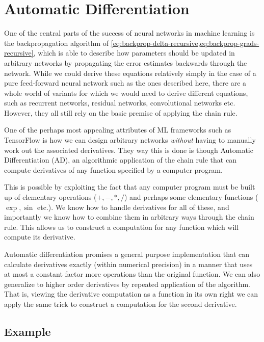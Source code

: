 \documentclass[Thesis.tex]{subfiles}
\begin{document}
\chapter{Automatic Differentiation}
\label{chp:auto-diff}

One of the central parts of the success of neural networks in machine learning
is the backpropagation algorithm of
\cref{eq:backprop-delta-recursive,eq:backprop-grads-recursive}, which is able to
describe how parameters should be updated in arbitrary networks by propagating
the error estimates backwards through the network. While we could derive these
equations relatively simply in the case of a pure feed-forward neural network
such as the ones described here, there are a whole world of variants for which
we would need to derive different equations, such as recurrent networks,
residual networks, convolutional networks etc. However, they all still rely on the basic
premise of applying the chain rule.

One of the perhaps most appealing attributes of ML frameworks such as TensorFlow
is how we can design arbitrary networks \emph{without} having to manually work
out the associated derivatives. They way this is done is though Automatic
Differentiation (AD), an algorithmic application of the chain rule that can
compute derivatives of any function specified by a computer program.

This is possible by exploiting the fact that any computer program must be built
up of elementary operations (\(+,-,*,/\)) and perhaps some elementary functions
(\(\exp, \sin\) etc.). We know how to handle derivatives for all of these, and
importantly we know how to combine them in arbitrary ways through the chain
rule. This allows us to construct a computation for any function which
will compute its derivative.

Automatic differentiation promises a general purpose implementation that can
calculate derivatives exactly (within numerical precision) in a manner that uses
at most a constant factor more operations than the original function. We can
also generalize to higher order derivatives by repeated application of the
algorithm. That is, viewing the derivative computation as a function in its own
right we can apply the same trick to construct a computation for the second
derivative.


\section{Example}
\end{document}
